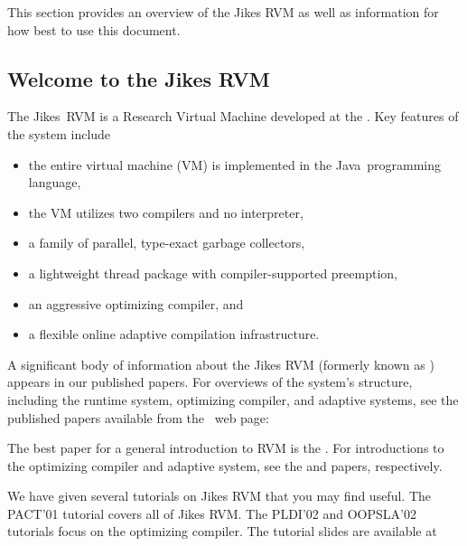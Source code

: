 This section provides an overview of the Jikes RVM as well as
information for how best to use this document.

\subsection{Welcome to the Jikes RVM}

The Jikes\JikesTMFootnote\ RVM is a Research Virtual Machine 
 developed at the 
.  Key
features of the system include
\begin{itemize}
\item the entire virtual machine (VM) is implemented in the
  Java\JavaTMFootnote\  programming language,
\item the VM utilizes two compilers and no interpreter,
\item a family of parallel, type-exact garbage collectors,
\item a lightweight thread package with compiler-supported preemption,
\item an aggressive optimizing compiler, and 
\item a flexible online adaptive compilation infrastructure.
\end{itemize}

A significant body of information about the Jikes RVM 
(formerly known as 
\xlink{\jp}{\JalapenoHomeURL}) appears 
in our published
papers.  For overviews of the system's structure, including the runtime system,
optimizing compiler, and adaptive systems, see the published papers
available from the \jrvm\ web page:
\begin{quote}
\xlink{{\RVMPubsURL}}{\RVMPubsURL}
\end{quote}

The best paper for a general introduction to RVM is 
the 
.  
For introductions to the
optimizing compiler and adaptive system, see the 
{\JavaGrandePaperURL}
 and 
{\OOPSLAPaperURL}  
papers, respectively.

We have given several tutorials on Jikes RVM that you may find
useful. The PACT'01 tutorial covers all of Jikes RVM.  The PLDI'02 and
OOPSLA'02 tutorials focus on the optimizing compiler.  The tutorial
slides are available at
\begin{quote}
\xlink{{\RVMSlidesURL}}{\RVMSlidesURL}
\end{quote}

